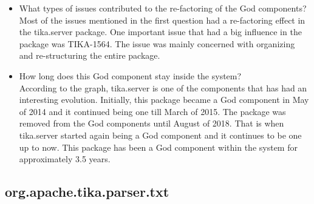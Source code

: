 \documentclass{article}
\begin{document}
\begin{itemize}
    \item What types of issues contributed to the re-factoring of the God components?\\
    Most of the issues mentioned in the first question had a re-factoring effect in the tika.server package. One important issue that had a big influence in the package was TIKA-1564. The issue was mainly concerned with organizing and re-structuring the entire package.
    \item  How long does this God component stay inside the system?\\
    According to the graph, tika.server is one of the components that has had an interesting evolution. Initially, this package became a God component in May of 2014 and it continued being one till March of 2015. The package was removed from the God components until August of 2018. That is when tika.server started again being a God component and it continues to be one up to now. This package has been a God component within the system for approximately 3.5 years.
\end{itemize}


\subsection{org.apache.tika.parser.txt}
\end{document}
